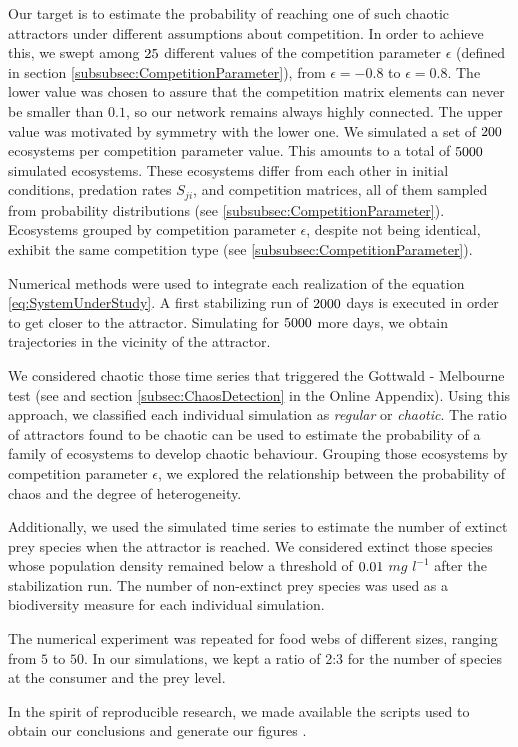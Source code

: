 Our target is to estimate the probability of reaching one of such chaotic attractors under different assumptions about competition. In order to achieve this, we swept among $25$ different values of the competition parameter $\epsilon$ (defined in section \ref{subsubsec:CompetitionParameter}), from $\epsilon = -0.8$ to $\epsilon = 0.8$. The lower value was chosen to assure that the competition matrix elements can never be smaller than $0.1$, so our network remains always highly connected. The upper value was motivated by symmetry with the lower one. We simulated a set of $200$ ecosystems per competition parameter value. This amounts to a total of $5000$ simulated ecosystems. These ecosystems differ from each other in initial conditions, predation rates $S_{ji}$, and competition matrices, all of them sampled from probability distributions (see \ref{subsubsec:CompetitionParameter}). Ecosystems grouped by competition parameter $\epsilon$, despite not being identical, exhibit the same competition type (see \ref{subsubsec:CompetitionParameter}).

Numerical methods were used to integrate each realization of the equation \eqref{eq:SystemUnderStudy}. A first stabilizing run of $ 2000 $ days is executed in order to get closer to the attractor. Simulating for $ 5000 $ more days, we obtain trajectories in the vicinity of the attractor.

We considered chaotic those time series that triggered the Gottwald - Melbourne test (see \citet{Gottwald2009} and section \ref{subsec:ChaosDetection} in the Online Appendix). Using this approach, we classified each individual simulation as \textit{regular} or \textit{chaotic}. The ratio of attractors found to be chaotic can be used to estimate the probability of a family of ecosystems to develop chaotic behaviour. Grouping those ecosystems by competition parameter $\epsilon$, we explored the relationship between the probability of chaos and the degree of heterogeneity.

Additionally, we used the simulated time series to estimate the number of extinct prey species when the attractor is reached. We considered extinct those species whose population density remained below a threshold of $0.01$ $mg$ $l^{-1}$ after the stabilization run. The number of non-extinct prey species was used as a biodiversity measure for each individual simulation.

The numerical experiment was repeated for food webs of different sizes, ranging from $5$ to $50$. In our simulations, we kept a ratio of 2:3 for the number of species at the consumer and the prey level.

In the spirit of reproducible research, we made available the scripts used to obtain our conclusions and generate our figures \citep{Rodriguez-Sanchez-code-neuchaos}.
